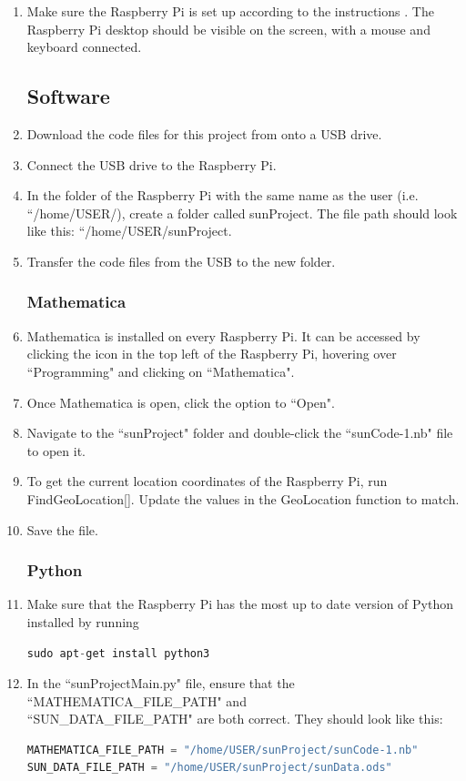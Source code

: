 \documentclass[titlepage]{article}
\begin{document}
\begin{enumerate}
    \item Make sure the Raspberry Pi is set up according to the instructions \cite{raspi_setup}. The Raspberry Pi desktop should be visible on the screen, with a mouse and keyboard connected.
\subsection*{Software}
    \item Download the code files for this project from \cite{github} onto a USB drive.
    \item Connect the USB drive to the Raspberry Pi. 
    \item In the folder of the Raspberry Pi with the same name as the user (i.e. ``/home/USER/), create a folder called sunProject. The file path should look like this: ``/home/USER/sunProject.
    \item Transfer the code files from the USB to the new folder.
\subsubsection*{Mathematica}
    \item Mathematica is installed on every Raspberry Pi. It can be accessed by clicking the icon in the top left of the Raspberry Pi, hovering over ``Programming" and clicking on ``Mathematica". 
    \item Once Mathematica is open, click the option to ``Open".
    \item Navigate to the ``sunProject" folder and double-click the ``sunCode-1.nb" file to open it.
    \item To get the current location coordinates of the Raspberry Pi, run FindGeoLocation[]. Update the values in the GeoLocation function to match.
    \item Save the file.
\subsubsection*{Python}
    \item Make sure that the Raspberry Pi has the most up to date version of Python installed by running
    \begin{lstlisting}[language=Python]
sudo apt-get install python3 \end{lstlisting}
    \item In the ``sunProjectMain.py" file, ensure that the ``MATHEMATICA\_FILE\_PATH" and \\ ``SUN\_DATA\_FILE\_PATH" are both correct. They should look like this: 
    \begin{lstlisting}[language=Python]
MATHEMATICA_FILE_PATH = "/home/USER/sunProject/sunCode-1.nb"
SUN_DATA_FILE_PATH = "/home/USER/sunProject/sunData.ods" \end{lstlisting}

\end{enumerate}
\end{document}
